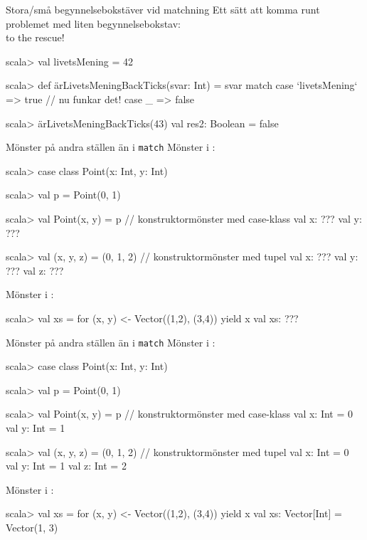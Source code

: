 \begin{Slide}{Stora/små begynnelsebokstäver vid matchning}
Ett sätt att komma runt problemet med liten begynnelsebokstav: \\
 to the rescue!
\begin{REPL}
scala> val livetsMening = 42

scala> def ärLivetsMeningBackTicks(svar: Int) = svar match 
         case `livetsMening` => true    // nu funkar det!
         case _ => false

scala> ärLivetsMeningBackTicks(43)
val res2: Boolean = false
\end{REPL}
\end{Slide}

\ifkompendium\else
\begin{Slide}{Mönster på andra ställen än i \texttt{match}}\SlideFontSmall
Mönster i :
\vspace{-0.25em}\begin{REPL}
scala> case class Point(x: Int, y: Int)

scala> val p = Point(0, 1)

scala> val Point(x, y) = p          // konstruktormönster med case-klass
val x: ???
val y: ???

scala> val (x, y, z) = (0, 1, 2)    // konstruktormönster med tupel
val x: ???
val y: ???
val z: ???

\end{REPL}
Mönster i :
\vspace{-0.25em}\begin{REPL}
scala> val xs = for (x, y) <- Vector((1,2), (3,4)) yield x
val xs: ???
\end{REPL}

\end{Slide}
\fi

\begin{Slide}{Mönster på andra ställen än i \texttt{match}}\SlideFontSmall
Mönster i :
\vspace{-0.25em}\begin{REPL}
scala> case class Point(x: Int, y: Int)

scala> val p = Point(0, 1)

scala> val Point(x, y) = p          // konstruktormönster med case-klass
val x: Int = 0
val y: Int = 1

scala> val (x, y, z) = (0, 1, 2)    // konstruktormönster med tupel
val x: Int = 0
val y: Int = 1
val z: Int = 2

\end{REPL}
Mönster i :
\vspace{-0.25em}\begin{REPL}
scala> val xs = for (x, y) <- Vector((1,2), (3,4)) yield x
val xs: Vector[Int] = Vector(1, 3)
\end{REPL}
\end{Slide}

